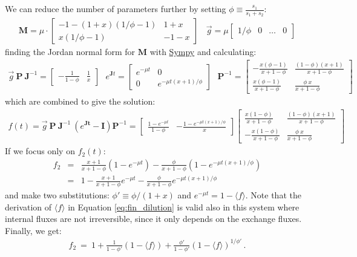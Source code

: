 \documentclass{article}
\newcommand{\fin}{\ensuremath{\langle f \rangle}}
\begin{document}
We can reduce the number of parameters further by setting $\phi \equiv \frac{s_1}{s_1+s_2}$:
\begin{eqnarray}
\mathbf{M} = \mu \cdot 
    \begin{bmatrix}
        - 1 - (1+x)(1/\phi-1) & 1+x \\
        x (1/\phi-1) & -1-x
    \end{bmatrix}
~~~~
\vec{g} = \mu \begin{bmatrix} 1/\phi & 0 & \ldots & 0 \end{bmatrix}
\end{eqnarray}
finding the Jordan normal form for $\mathbf{M}$ with \href{https://www.sympy.org/}{Sympy} and calculating:
\begin{eqnarray}
\vec{g}~\mathbf{P}~\mathbf{J}^{-1} = 
    \begin{bmatrix}
        -\frac{1}{1-\phi} & \frac{1}{x}
    \end{bmatrix}
~~~
e^{\mathbf{J} t} =
    \begin{bmatrix}
        e^{-\mu t} & 0 \\
        0 & e^{-\mu t (x+1)/\phi}
    \end{bmatrix}
~~~
\mathbf{P}^{-1} = 
    \begin{bmatrix}
		-\frac{x(\phi-1)}{x + 1 - \phi} & \frac{(1-\phi)(x+1)}{x + 1 - \phi} \\
		\frac{x(\phi-1)}{x + 1 - \phi} & \frac{\phi~x}{x + 1 - \phi} 
	\end{bmatrix}
\end{eqnarray}
which are combined to give the solution:
\begin{eqnarray}
    f(t) = 
    \vec{g} ~ \mathbf{P} ~ \mathbf{J}^{-1} ~ \left( e^{\mathbf{J t}} - \mathbf{I} \right) \mathbf{P}^{-1}
    = 
    \begin{bmatrix}
		\frac{1-e^{-\mu t}}{1-\phi} &
		-\frac{1 - e^{-\mu t (x+1)/\phi}}{x}
	\end{bmatrix}
    \begin{bmatrix}
		\frac{x(1-\phi)}{x + 1 - \phi} & \frac{(1-\phi)(x+1)}{x + 1 - \phi} \\
		-\frac{x(1-\phi)}{x + 1 - \phi} & \frac{\phi~x}{x + 1 - \phi} 
	\end{bmatrix}
\end{eqnarray}
If we focus only on $f_2(t)$:
\begin{eqnarray}
    f_2 &=& 
    \frac{x+1}{x+1-\phi} (1 - e^{-\mu t}) -
    \frac{\phi}{x+1-\phi}(1 - e^{-\mu t (x+1)/\phi})\\
    &=&
    1 - \frac{x+1}{x+1-\phi} e^{-\mu t} - 
    \frac{\phi}{x+1-\phi} e^{-\mu t (x+1)/\phi}
\end{eqnarray}
and make two substitutions: $\phi' \equiv \phi/(1+x)$ and $e^{-\mu t} = 1 - \fin$. Note that the derivation of $\fin$ in Equation \ref{eq:fin_dilution} is valid also in this system where internal fluxes are not irreversible, since it only depends on the exchange fluxes. Finally, we get:
\begin{eqnarray}
    f_2 ~=~ 
    1 + \frac{1}{1-\phi'} (1-\fin) + \frac{\phi'}{1-\phi'} (1-\fin)^{1/\phi'}
	\label{eq:two_step_reversible}\,.
\end{eqnarray}
\end{document}
